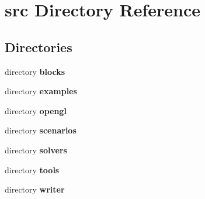\section{src Directory Reference}
\label{dir_68267d1309a1af8e8297ef4c3efbcdba}
\subsection*{Directories}
\begin{DoxyCompactItemize}
\item 
directory {\bf blocks}
\item 
directory {\bf examples}
\item 
directory {\bf opengl}
\item 
directory {\bf scenarios}
\item 
directory {\bf solvers}
\item 
directory {\bf tools}
\item 
directory {\bf writer}
\end{DoxyCompactItemize}
